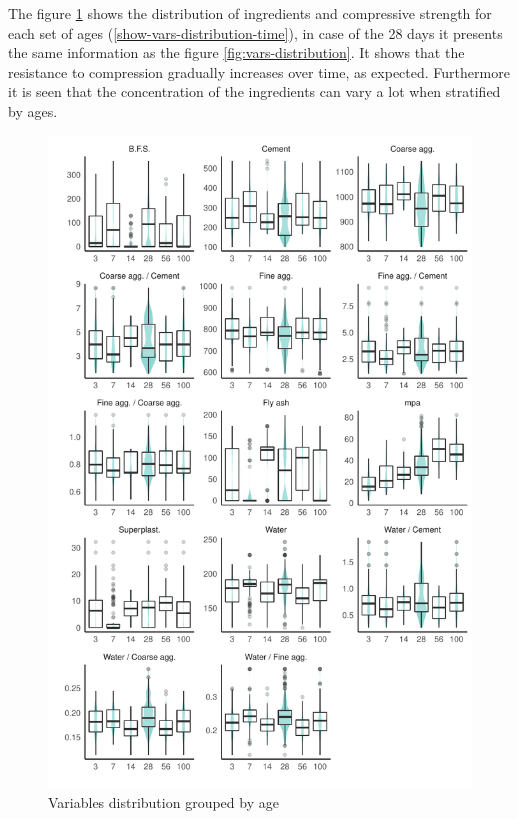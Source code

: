 \documentclass[
]{article}
\begin{document}
The figure \ref{fig:vars-distribution-time} shows the distribution of
ingredients and compressive strength for each set of ages
(\ref{show-vars-distribution-time}), in case of the 28 days it presents
the same information as the figure \ref{fig:vars-distribution}. It shows
that the resistance to compression gradually increases over time, as
expected. Furthermore it is seen that the concentration of the
ingredients can vary a lot when stratified by ages.

\begin{figure}

{\centering \includegraphics{paper_EN_files/figure-latex/vars-distribution-time-1} 

}

\caption{Variables distribution grouped by age}\label{fig:vars-distribution-time}
\end{figure}
\end{document}
